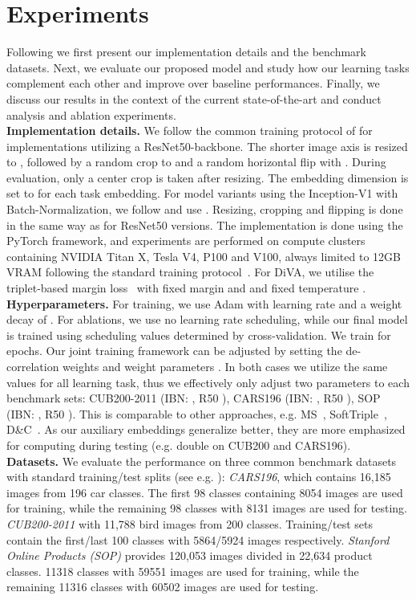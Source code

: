 \documentclass[runningheads]{llncs}
\begin{document}
\section{Experiments}
\label{sec:Experiments}
Following we first present our implementation details and the benchmark datasets. Next, we evaluate our proposed model and study how our learning tasks complement each other and improve over baseline performances. Finally, we discuss our results in the context of the current state-of-the-art and conduct analysis and ablation experiments.
\\
\textbf{Implementation details.} 
We follow the common training protocol of \cite{margin,mic,Sanakoyeu_2019_CVPR} for implementations utilizing a ResNet50-backbone. The shorter image axis is resized to , followed by a random crop to  and a random horizontal flip with . During evaluation, only a center crop is taken after resizing. The embedding dimension is set to  for each task embedding. For model variants using the Inception-V1 with Batch-Normalization\cite{googlenetv2}, we follow \cite{multisimilarity,horde} and use . Resizing, cropping and flipping is done in the same way as for ResNet50 versions. The implementation is done using the PyTorch framework\cite{pytorch}, and experiments are performed on compute clusters containing NVIDIA Titan X, Tesla V4, P100 and V100, always limited to 12GB VRAM following the standard training protocol~\cite{margin}. For DiVA, we utilise the triplet-based margin loss~\cite{margin} with fixed margin  and  and fixed temperature . 
\\
\textbf{Hyperparameters.}
For training, we use Adam\cite{adam} with learning rate  and a weight decay of . For ablations, we use no learning rate scheduling, while our final model is trained using scheduling values determined by cross-validation. We train for  epochs. Our joint training framework can be adjusted by setting the de-correlation weights  and weight parameters . In both cases we utilize the same values for all learning task, thus we effectively only adjust two parameters  to each benchmark sets: CUB200-2011 (IBN: , R50 ), CARS196 (IBN: , R50 ), SOP (IBN: , R50 ). This is comparable to other approaches, e.g. MS~\cite{multisimilarity}, SoftTriple~\cite{softriple}, D\&C~\cite{Sanakoyeu_2019_CVPR}. As our auxiliary embeddings generalize better, they are more emphasized for computing  during testing (e.g. double on CUB200 and CARS196).
\\
\textbf{Datasets.} We evaluate the performance on three common benchmark datasets with standard training/test splits (see e.g. \cite{margin,mic,Sanakoyeu_2019_CVPR,multisimilarity}):
\textit{CARS196}\cite{cars196}, which contains 16,185 images from 196 car classes. The first 98 classes containing 8054 images are used for training, while the remaining 98 classes with 8131 images are used for testing. \textit{CUB200-2011}\cite{cub200-2011} with 11,788 bird images from 200 classes. Training/test sets contain the first/last 100 classes with 5864/5924 images respectively. \textit{Stanford Online Products (SOP)}\cite{lifted} provides 120,053 images divided in 22,634 product classes. 11318 classes with 59551 images are used for training, while the remaining 11316 classes with 60502 images are used for testing.
\end{document}
